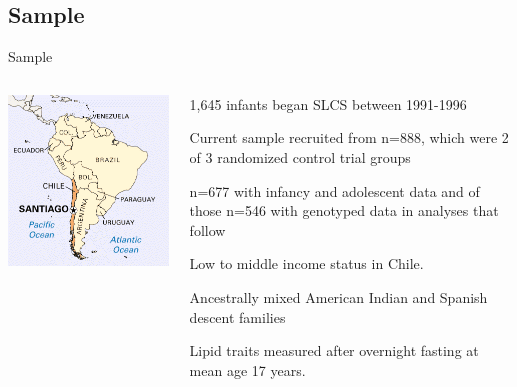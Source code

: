 \documentclass[pdf]{beamer}\usepackage[]{graphicx}\usepackage[]{color}
\begin{document}
\subsection{Sample}
\begin{frame}{Sample}

\begin{columns}[T] %
\begin{column}{.35\textwidth}
\centering
\includegraphics[scale=0.6]{santiago-map.png}
\end{column}%
\hfill%
\begin{column}{.6\textwidth}

\vspace{-1em}

 \begin{itemize}\small{
          \item 1,645 infants began SLCS between 1991-1996
          \item \raggedright Current sample recruited from n=888, which were 2 of 3 randomized control trial groups
          \item  n=677 with infancy and adolescent data and of those n=546 with genotyped data in analyses that follow
          \item Low to middle income status in Chile.
          \item Ancestrally mixed American Indian and Spanish descent families
          \item Lipid traits measured after overnight fasting at mean age 17 years.}
          \end{itemize}

\end{column}%
\end{columns}

\end{frame}
        
\end{document}

